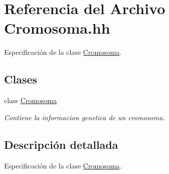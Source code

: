 \hypertarget{_cromosoma_8hh}{}\section{Referencia del Archivo Cromosoma.\+hh}
\label{_cromosoma_8hh}


Especificación de la clase \hyperlink{class_cromosoma}{Cromosoma}.  


\subsection*{Clases}
\begin{DoxyCompactItemize}
\item 
class \hyperlink{class_cromosoma}{Cromosoma}
\begin{DoxyCompactList}\small\item\em Contiene la informacion genetica de un cromosoma. \end{DoxyCompactList}\end{DoxyCompactItemize}


\subsection{Descripción detallada}
Especificación de la clase \hyperlink{class_cromosoma}{Cromosoma}. 

